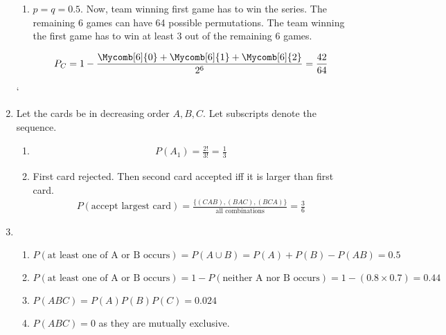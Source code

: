 \begin{enumerate}
\begin{enumerate}
		\item $ p = q = 0.5 $. Now, team winning first game has to win the series.
		The remaining 6 games can have 64 possible permutations. The team winning the first game has to win at least 3 out of the remaining 6 games. 
		
		\begin{align}
			P_C = 1 - \frac{\Mycomb[6]{0} + \Mycomb[6]{1} + \Mycomb[6]{2} }{2^6} = \frac{42}{64}
		\end{align}
		
	\end{enumerate}
	
	`	\item Let the cards be in decreasing order $ A, B, C $. Let subscripts denote the sequence.
	\begin{enumerate}
		\item \begin{align}
			P(A_1) = \frac{2!}{3!} = \frac{1}{3}
		\end{align}
		
		\item First card rejected. Then second card accepted iff it is larger than first card.
		\begin{subequations}
			\begin{align}
				P(\text{accept largest card}) = \frac{\{(CAB), (BAC), (BCA)\}}{\text{all combinations}} = \frac{3}{6}
			\end{align}
		\end{subequations}
	\end{enumerate}
	
	\item \begin{enumerate}
		\item $ P(\text{at least one of A or B occurs}) = P(A \cup B) = P(A) + P(B) - P(AB) = 0.5$\\
		
		\item $ P(\text{at least one of A or B occurs}) = 1 - P(\text{neither A nor B occurs}) = 1 - (0.8 \times 0.7) = 0.44$ \\
		
		\item $ P(ABC) = P(A) P(B) P(C) = 0.024 $\\
		
		\item $ P(ABC) = 0 $ as they are mutually exclusive.
		
	\end{enumerate}
	

\end{enumerate}
